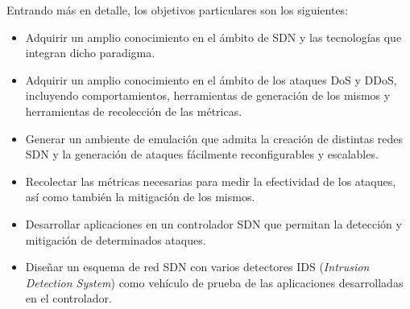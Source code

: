 Entrando más en detalle, los objetivos particulares son los siguientes:
\begin{itemize}
\item Adquirir un amplio conocimiento en el ámbito de SDN y las tecnologías que
  integran dicho paradigma.
\item Adquirir un amplio conocimiento en el ámbito de los ataques DoS y DDoS,
  incluyendo comportamientos, herramientas de generación de los mismos y
  herramientas de recolección de las métricas.
\item Generar un ambiente de emulación que admita la creación de distintas redes SDN y la generación de ataques fácilmente reconfigurables y escalables.
\item Recolectar las métricas necesarias para medir la efectividad de los
  ataques, así como también la mitigación de los mismos.
\item Desarrollar aplicaciones en un controlador SDN que permitan la detección y
  mitigación de determinados ataques.
\item Diseñar un esquema de red SDN con varios detectores IDS (\textit{Intrusion
  Detection System}) como vehículo de prueba de las aplicaciones desarrolladas en
  el controlador.
\end{itemize}


